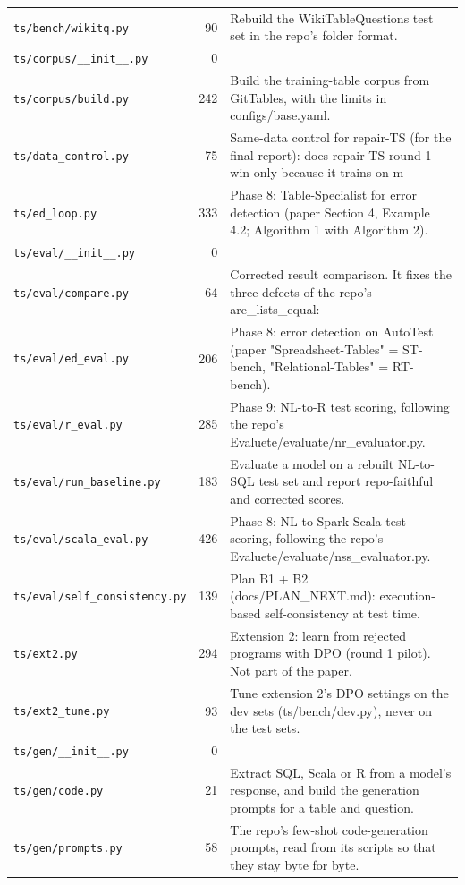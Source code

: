 {\begin{longtable}{@{}p{4.6cm}rp{9.2cm}@{}}
\texttt{ts/bench/wikitq.py} & 90 & Rebuild the WikiTableQuestions test set in the repo's folder format.\\
\texttt{ts/corpus/\_\_init\_\_.py} & 0 & \\
\texttt{ts/corpus/build.py} & 242 & Build the training-table corpus from GitTables, with the limits in configs/base.yaml.\\
\texttt{ts/data\_control.py} & 75 & Same-data control for repair-TS (for the final report): does repair-TS round 1 win only because it trains on m\\
\texttt{ts/ed\_loop.py} & 333 & Phase 8: Table-Specialist for error detection (paper Section 4, Example 4.2; Algorithm 1 with Algorithm 2).\\
\texttt{ts/eval/\_\_init\_\_.py} & 0 & \\
\texttt{ts/eval/compare.py} & 64 & Corrected result comparison. It fixes the three defects of the repo's are\_lists\_equal:\\
\texttt{ts/eval/ed\_eval.py} & 206 & Phase 8: error detection on AutoTest (paper "Spreadsheet-Tables" = ST-bench, "Relational-Tables" = RT-bench).\\
\texttt{ts/eval/r\_eval.py} & 285 & Phase 9: NL-to-R test scoring, following the repo's Evaluete/evaluate/nr\_evaluator.py.\\
\texttt{ts/eval/run\_baseline.py} & 183 & Evaluate a model on a rebuilt NL-to-SQL test set and report repo-faithful and corrected scores.\\
\texttt{ts/eval/scala\_eval.py} & 426 & Phase 8: NL-to-Spark-Scala test scoring, following the repo's Evaluete/evaluate/nss\_evaluator.py.\\
\texttt{ts/eval/self\_consistency.py} & 139 & Plan B1 + B2 (docs/PLAN\_NEXT.md): execution-based self-consistency at test time.\\
\texttt{ts/ext2.py} & 294 & Extension 2: learn from rejected programs with DPO (round 1 pilot). Not part of the paper.\\
\texttt{ts/ext2\_tune.py} & 93 & Tune extension 2's DPO settings on the dev sets (ts/bench/dev.py), never on the test sets.\\
\texttt{ts/gen/\_\_init\_\_.py} & 0 & \\
\texttt{ts/gen/code.py} & 21 & Extract SQL, Scala or R from a model's response, and build the generation prompts for a table and question.\\
\texttt{ts/gen/prompts.py} & 58 & The repo's few-shot code-generation prompts, read from its scripts so that they stay byte for byte.\\

\end{longtable}}

